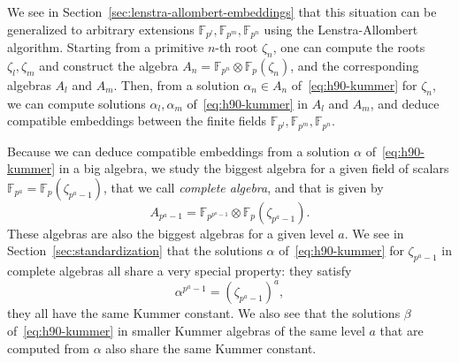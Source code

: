 We see in Section~\ref{sec:lenstra-allombert-embeddings} that this situation can
be generalized to arbitrary extensions $\mathbb{F}_{p^{l}}, \mathbb{F}_{p^{m}},
\mathbb{F}_{p^{n}}$ using the Lenstra-Allombert algorithm. Starting from a
primitive $n$-th root $\zeta_n$, one can compute the roots $\zeta_l, \zeta_m$
and construct the algebra $A_n =
\mathbb{F}_{p^{n}}\otimes\mathbb{F}_{p}(\zeta_n)$, and the corresponding
algebras $A_l$ and $A_m$. Then, from a solution $\alpha_n\in A_n$
of~\eqref{eq:h90-kummer} for $\zeta_n$, we can compute solutions $\alpha_l,
\alpha_m$ of~\eqref{eq:h90-kummer} in $A_l$ and $A_m$, and deduce compatible
embeddings between the finite fields $\mathbb{F}_{p^{l}},
\mathbb{F}_{p^{m}}, \mathbb{F}_{p^{n}}$.
\begin{center}
\end{center}
Because we can deduce compatible embeddings from a solution $\alpha$
of~\eqref{eq:h90-kummer} in a big algebra, we study the biggest algebra for a
given field of scalars $\mathbb{F}_{p^{a}}=\mathbb{F}_p(\zeta_{p^a-1})$, that we
call \emph{complete algebra}, and that is given by
\[
  A_{p^a-1} = \mathbb{F}_{p^{p^a-1}}\otimes \mathbb{F}_p(\zeta_{p^a-1}).
\]
These algebras are also the biggest algebras for a given level $a$.
We see in Section~\ref{sec:standardization} that the solutions $\alpha$
of~\eqref{eq:h90-kummer} for $\zeta_{p^a-1}$ in complete algebras all share a
very special property: they satisfy
\[
  \alpha^{p^a-1} = (\zeta_{p^a-1})^a,
\]
\ie they all have the same Kummer constant. We also see that the solutions
$\beta$ of~\eqref{eq:h90-kummer} in smaller Kummer algebras of the same level
$a$ that are computed from $\alpha$ also share the same Kummer constant.
